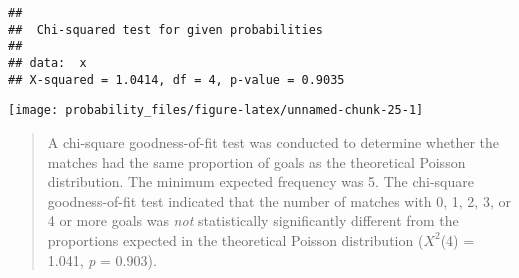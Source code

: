 \documentclass[
]{book}
\newenvironment{Shaded}{\begin{snugshade}}{\end{snugshade}}
\newcommand{\DataTypeTok}[1]{\textcolor[rgb]{0.13,0.29,0.53}{#1}}
\newcommand{\DecValTok}[1]{\textcolor[rgb]{0.00,0.00,0.81}{#1}}
\newcommand{\KeywordTok}[1]{\textcolor[rgb]{0.13,0.29,0.53}{\textbf{#1}}}
\newcommand{\NormalTok}[1]{#1}
\newcommand{\OperatorTok}[1]{\textcolor[rgb]{0.81,0.36,0.00}{\textbf{#1}}}
\newcommand{\OtherTok}[1]{\textcolor[rgb]{0.56,0.35,0.01}{#1}}
\newcommand{\StringTok}[1]{\textcolor[rgb]{0.31,0.60,0.02}{#1}}
\begin{document}
\begin{Shaded}
\end{Shaded}

\begin{verbatim}
## 
##  Chi-squared test for given probabilities
## 
## data:  x
## X-squared = 1.0414, df = 4, p-value = 0.9035
\end{verbatim}

\begin{center}\texttt{[image: probability\_files/figure-latex/unnamed-chunk-25-1]} \end{center}

\begin{quote}
A chi-square goodness-of-fit test was conducted to determine whether the matches had the same proportion of goals as the theoretical Poisson distribution. The minimum expected frequency was 5. The chi-square goodness-of-fit test indicated that the number of matches with 0, 1, 2, 3, or 4 or more goals was \emph{not} statistically significantly different from the proportions expected in the theoretical Poisson distribution (\(X^2\)(4) = 1.041, \emph{p} = 0.903).
\end{quote}
\end{document}
